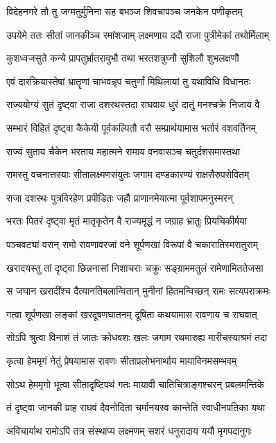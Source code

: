 \twolineshloka
{विदेहनगरे तौ तु जग्मतुर्मुनिना सह}
{बभञ्ज शिवचापञ्च जनकेन पणीकृतम्}%

\twolineshloka
{उपयेमे ततः सीतां जानकीञ्च रमांशजाम्}
{लक्ष्मणाय ददौ राजा पुत्रीमेकां तथोर्मिलाम्}%

\twolineshloka
{कुशध्वजसुते कन्ये प्रापतुर्भ्रातरावुभौ}
{तथा भरतशत्रुघ्नौ सुशिलौ शुभलक्षणौ}%

\twolineshloka
{एवं दारक्रियास्तेषां भ्रातॄणां चाभवन्नृप}
{चतुर्णां मिथिलायां तु यथाविधि विधानतः}%

\twolineshloka
{राज्ययोग्यं सुतं दृष्ट्वा राजा दशरथस्तदा}
{राघवाय धुरं दातुं मनश्चक्रे निजाय वै}%

\twolineshloka
{सम्भारं विहितं दृष्ट्वा कैकेयी पूर्वकल्पितौ}
{वरौ सम्प्रार्थयामास भर्तारं वशवर्तिनम्}%

\twolineshloka
{राज्यं सुताय चैकेन भरताय महात्मने}
{रामाय वनवासञ्च चतुर्दशसमास्तथा}%

\twolineshloka
{रामस्तु वचनात्तस्याः सीतालक्ष्मणसंयुतः}
{जगाम दण्डकारण्यं राक्षसैरुपसेवितम्}%

\twolineshloka
{राजा दशरथः पुत्रविरहेण प्रपीडितः}
{जहौ प्राणानमेयात्मा पूर्वशापमनुस्मरन्}%

\twolineshloka
{भरतः पितरं दृष्ट्वा मृतं मातृकृतेन वै}
{राज्यमृद्धं न जग्राह भ्रातुः प्रियचिकीर्षया}%

\twolineshloka
{पञ्चवट्यां वसन् रामो रावणावरजां वने}
{शूर्पणखां विरूपां वै चकारातिस्मरातुराम्}%

\twolineshloka
{खरादयस्तु तां दृष्ट्वा छिन्ननासां निशाचराः}
{चक्रुः सङ्ग्राममतुलं रामेणामिततेजसा}%

\twolineshloka
{स जघान खरादींश्च दैत्यानतिबलान्वितान्}
{मुनीनां हितमन्विच्छन् रामः सत्यपराक्रमः}%

\twolineshloka
{गत्वा शूर्पणखा लङ्कां खरदूषणघातनम्}
{दूषिता कथयामास रावणाय च राघवात्}%

\twolineshloka
{सोऽपि श्रुत्वा विनाशं तं जातः क्रोधवशः खलः}
{जगाम रथमारुह्य मारीचस्याश्रमं तदा}%

\twolineshloka
{कृत्वा हेममृगं नेतुं प्रेषयामास रावणः}
{सीताप्रलोभनार्थाय मायाविनमसम्भवम्}%

\twolineshloka
{सोऽथ हेममृगो भूत्वा सीतादृष्टिपथं गतः}
{मायावी चातिचित्राङ्गश्चरन् प्रबलमन्तिके}%

\twolineshloka
{तं दृष्ट्वा जानकी प्राह राघवं दैवनोदिता}
{चर्मानयस्व कान्तेति स्वाधीनपतिका यथा}%

\twolineshloka
{अविचार्याथ रामोऽपि तत्र संस्थाप्य लक्ष्मणम्}
{सशरं धनुरादाय ययौ मृगपदानुगः}%

